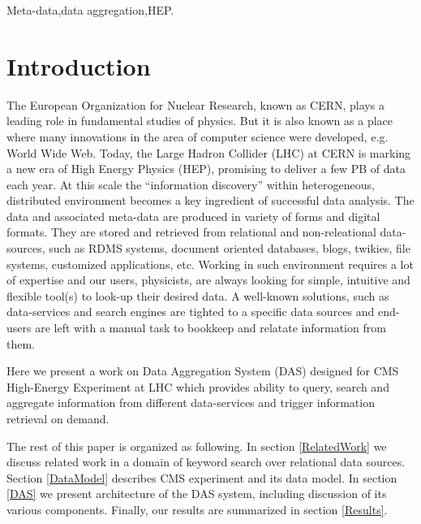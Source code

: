 \documentclass[1p,times]{elsarticle}
\begin{document}
\begin{frontmatter}
\begin{keyword}
Meta-data\sep data aggregation\sep HEP.


\end{keyword}

\end{frontmatter}


\section{Introduction}
The European Organization for Nuclear Research, known as CERN, plays a leading
role in fundamental studies of physics. But it is also known as a place where
many innovations in the area of computer science were developed, e.g. World Wide Web.
Today, the Large Hadron Collider (LHC) at CERN is marking a new era of High Energy
Physics (HEP), promising to deliver a few PB of data each year. 
At this scale the ``information discovery'' within heterogeneous, distributed 
environment becomes a key ingredient of successful data analysis.
The data and associated meta-data are produced in variety of forms and digital formats.
They are stored and retrieved from relational and non-releational data-sources, such as 
RDMS systems, document oriented databases, blogs, twikies, file systems,
customized applications, etc. 
Working in such environment requires a lot of expertise and our users, physicists, 
are always looking for simple, intuitive and flexible
tool(s) to look-up their desired data. A well-known solutions, such as data-services
and search engines are tighted to a specific data sources and end-users are left 
with a manual task to bookkeep and relatate information from them.

Here we present a work on Data Aggregation System (DAS) designed for
CMS High-Energy Experiment at LHC which provides
ability to query, search and aggregate information from different 
data-services and trigger information retrieval on demand.

The rest of this paper is organized as following. 
In section \ref{RelatedWork} we discuss related work in a domain of 
keyword search over relational data sources.
Section \ref{DataModel} describes CMS experiment and its data model. In section
\ref{DAS} we present architecture of the DAS system, including discussion of its
various components. Finally, our results are summarized in section \ref{Results}.
\end{document}
